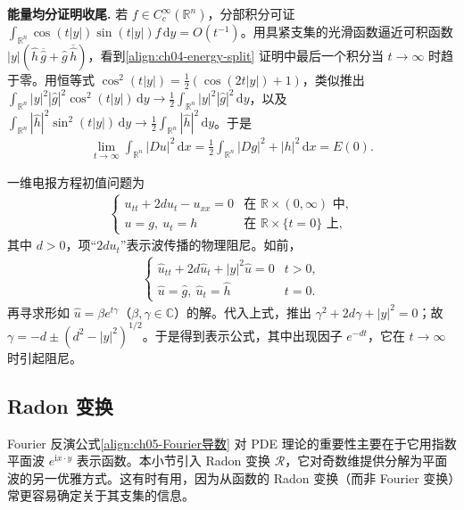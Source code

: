 \documentclass[../../main.tex]{subfiles}
\begin{document}
\textbf{能量均分证明收尾.} 若 $f\in C_c^\infty(\mathbb{R}^n)$，分部积分可证 $\int_{\mathbb{R}^n}\cos(t|y|)\sin(t|y|)f\,\mathrm{d}y=O(t^{-1})$。用具紧支集的光滑函数逼近可积函数 $|y|(\widehat{h}\,\overline{\widehat{g}}+\widehat{g}\,\overline{\widehat{h}})$，看到\eqref{align:ch04-energy-split} 证明中最后一个积分当 $t\to\infty$ 时趋于零。用恒等式 $\cos^2(t|y|)=\tfrac{1}{2}(\cos(2t|y|)+1)$，类似推出 $\int_{\mathbb{R}^n}|y|^2|\widehat{g}|^2\cos^2(t|y|)\,\mathrm{d}y\to\tfrac{1}{2}\int_{\mathbb{R}^n}|y|^2|\widehat{g}|^2\,\mathrm{d}y$，以及 $\int_{\mathbb{R}^n}|\widehat{h}|^2\sin^2(t|y|)\,\mathrm{d}y\to\tfrac{1}{2}\int_{\mathbb{R}^n}|\widehat{h}|^2\,\mathrm{d}y$。于是
\begin{align*}
\lim_{t\to\infty}\int_{\mathbb{R}^n}|Du|^2\,\mathrm{d}x=\frac{1}{2}\int_{\mathbb{R}^n}|Dg|^2+|h|^2\,\mathrm{d}x=E(0).
\end{align*}

\begin{example}[电报方程]\label{example:ch04-telegraph}一维电报方程初值问题为
\begin{align}\label{align:ch04-telegraph}
\begin{cases}
u_{tt}+2du_t-u_{xx}=0 & \text{在 }\mathbb{R}\times(0,\infty)\text{ 中},\\
u=g,\ u_t=h & \text{在 }\mathbb{R}\times\{t=0\}\text{ 上},
\end{cases}
\end{align}
其中 $d>0$，项``$2du_t$''表示波传播的物理阻尼。如前，
\begin{align*}
\begin{cases}
\widehat{u}_{tt}+2d\widehat{u}_t+|y|^2\widehat{u}=0 & t>0,\\
\widehat{u}=\widehat{g},\ \widehat{u}_t=\widehat{h} & t=0.
\end{cases}
\end{align*}
再寻求形如 $\widehat{u}=\beta e^{t\gamma}$（$\beta,\gamma\in\mathbb{C}$）的解。代入上式，推出 $\gamma^2+2d\gamma+|y|^2=0$；故 $\gamma=-d\pm(d^2-|y|^2)^{1/2}$。于是得到表示公式，其中出现因子 $e^{-dt}$，它在 $t\to\infty$ 时引起阻尼。
\end{example}

\subsection{Radon 变换}\label{subsection:ch04-radon}

Fourier 反演公式\eqref{align:ch05-Fourier导数} 对 PDE 理论的重要性主要在于它用指数平面波 $e^{\mathrm{i}x\cdot y}$ 表示函数。本小节引入 Radon 变换 $\mathcal{R}$，它对奇数维提供分解为平面波的另一优雅方式。这有时有用，因为从函数的 Radon 变换（而非 Fourier 变换）常更容易确定关于其支集的信息。
\end{document}
